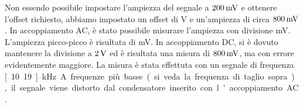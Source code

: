 \documentclass[italian,a4paper]{article}
\begin{document}
Non essendo possibile impostare l'ampiezza del segnale a $\unit[200]{mV}$ e ottenere l'offset richiesto,
abbiamo impostato un offset di \unit[5]{V} e un'ampiezza di circa
$\unit[800]{mV}$. In accoppiamento AC, è stato possibile misurare l'ampiezza
con divisione \unit[200]{mV}. L'ampiezza picco-picco è
risultata di \unit[832]{mV}. In accoppiamento DC, si è dovuto mantenere la
divisione a $\unit[2]{V}$ ed è risultata una misura di $\unit[800]{mV}$, ma
con errore evidentemente maggiore. La misura è stata effettuta con un segnale di frequenza \unit[10.19]{kHz}. A
frequenze più basse (si veda la frequenza di taglio sopra), il segnale viene
distorto dal condensatore inserito con l'accoppiamento AC.
\end{document}
